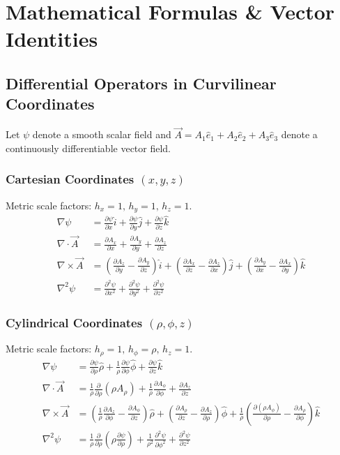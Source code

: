 \chapter{Mathematical Formulas \& Vector Identities}

\section{Differential Operators in Curvilinear Coordinates}
Let $\psi$ denote a smooth scalar field and $\vec{A} = A_1 \hat{e}_1 + A_2 \hat{e}_2 + A_3 \hat{e}_3$ denote a continuously differentiable vector field.

\subsection{Cartesian Coordinates $(x, y, z)$}
Metric scale factors: $h_x = 1, \, h_y = 1, \, h_z = 1$.
\begin{align}
\nabla \psi &= \frac{\partial \psi}{\partial x}\hat{i} + \frac{\partial \psi}{\partial y}\hat{j} + \frac{\partial \psi}{\partial z}\hat{k} \\
\nabla \cdot \vec{A} &= \frac{\partial A_x}{\partial x} + \frac{\partial A_y}{\partial y} + \frac{\partial A_z}{\partial z} \\
\nabla \times \vec{A} &= \left(\frac{\partial A_z}{\partial y} - \frac{\partial A_y}{\partial z}\right)\hat{i} + \left(\frac{\partial A_x}{\partial z} - \frac{\partial A_z}{\partial x}\right)\hat{j} + \left(\frac{\partial A_y}{\partial x} - \frac{\partial A_x}{\partial y}\right)\hat{k} \\
\nabla^2 \psi &= \frac{\partial^2 \psi}{\partial x^2} + \frac{\partial^2 \psi}{\partial y^2} + \frac{\partial^2 \psi}{\partial z^2}
\end{align}

\subsection{Cylindrical Coordinates $(\rho, \phi, z)$}
Metric scale factors: $h_\rho = 1, \, h_\phi = \rho, \, h_z = 1$.
\begin{align}
\nabla \psi &= \frac{\partial \psi}{\partial \rho}\hat{\rho} + \frac{1}{\rho}\frac{\partial \psi}{\partial \phi}\hat{\phi} + \frac{\partial \psi}{\partial z}\hat{k} \\
\nabla \cdot \vec{A} &= \frac{1}{\rho}\frac{\partial}{\partial \rho}(\rho A_\rho) + \frac{1}{\rho}\frac{\partial A_\phi}{\partial \phi} + \frac{\partial A_z}{\partial z} \\
\nabla \times \vec{A} &= \left(\frac{1}{\rho}\frac{\partial A_z}{\partial \phi} - \frac{\partial A_\phi}{\partial z}\right)\hat{\rho} + \left(\frac{\partial A_\rho}{\partial z} - \frac{\partial A_z}{\partial \rho}\right)\hat{\phi} + \frac{1}{\rho}\left(\frac{\partial (\rho A_\phi)}{\partial \rho} - \frac{\partial A_\rho}{\partial \phi}\right)\hat{k} \\
\nabla^2 \psi &= \frac{1}{\rho}\frac{\partial}{\partial \rho}\left(\rho\frac{\partial \psi}{\partial \rho}\right) + \frac{1}{\rho^2}\frac{\partial^2 \psi}{\partial \phi^2} + \frac{\partial^2 \psi}{\partial z^2}
\end{align}

